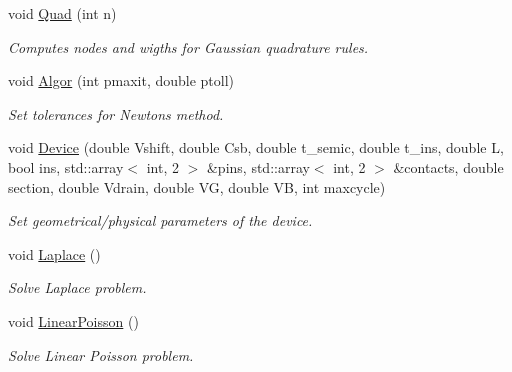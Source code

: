 \begin{DoxyCompactItemize}
void \mbox{\hyperlink{class_probl_a20e64318e853ac58c258c4c1d20a2315}{Quad}} (int n)
\begin{DoxyCompactList}\small\item\em Computes nodes and wigths for Gaussian quadrature rules. \end{DoxyCompactList}\item 
\mbox{\label{class_probl_aef98437ee923d5ecc17e01bc85656522}} 
void \mbox{\hyperlink{class_probl_aef98437ee923d5ecc17e01bc85656522}{Algor}} (int pmaxit, double ptoll)
\begin{DoxyCompactList}\small\item\em Set tolerances for Newton\textquotesingle{}s method. \end{DoxyCompactList}\item 
\mbox{\label{class_probl_a60041def522e51a75d21e172362b6944}} 
void \mbox{\hyperlink{class_probl_a60041def522e51a75d21e172362b6944}{Device}} (double Vshift, double Csb, double t\+\_\+semic, double t\+\_\+ins, double L, bool ins, std\+::array$<$ int, 2 $>$ \&pins, std\+::array$<$ int, 2 $>$ \&contacts, double section, double Vdrain, double VG, double VB, int maxcycle)
\begin{DoxyCompactList}\small\item\em Set geometrical/physical parameters of the device. \end{DoxyCompactList}\item 
\mbox{\label{class_probl_a07cc161806dfcce5e7cdf980b5e211c4}} 
void \mbox{\hyperlink{class_probl_a07cc161806dfcce5e7cdf980b5e211c4}{Laplace}} ()
\begin{DoxyCompactList}\small\item\em Solve Laplace problem. \end{DoxyCompactList}\item 
\mbox{\label{class_probl_a7ddf75d53dc3cd0ceaebad0e8b87c87c}} 
void \mbox{\hyperlink{class_probl_a7ddf75d53dc3cd0ceaebad0e8b87c87c}{Linear\+Poisson}} ()
\begin{DoxyCompactList}\small\item\em Solve Linear Poisson problem. \end{DoxyCompactList}\item 
\mbox{\label{class_probl_a1058c4e0191ea44dcbcd58426247b315}} 

\end{DoxyCompactItemize}
